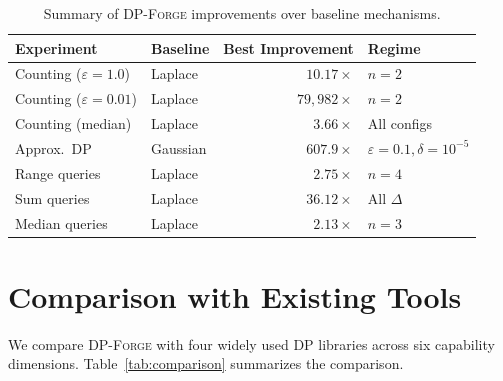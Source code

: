 \documentclass[11pt,a4paper]{article}
\newcommand{\dpforge}{\textsc{DP-Forge}}
\newcommand{\eps}{\varepsilon}
\begin{document}
\begin{table}[t]
\centering
\caption{Summary of \dpforge{} improvements over baseline mechanisms.}
\label{tab:summary}
\small
\begin{tabular}{@{}llrl@{}}
\toprule
Experiment & Baseline & Best Improvement & Regime \\
\midrule
Counting ($\eps=1.0$)  & Laplace  & $10.17\times$ & $n=2$ \\
Counting ($\eps=0.01$) & Laplace  & $79{,}982\times$ & $n=2$ \\
Counting (median)      & Laplace  & $3.66\times$ & All configs \\
Approx.\ DP            & Gaussian & $607.9\times$ & $\eps=0.1, \delta=10^{-5}$ \\
Range queries           & Laplace  & $2.75\times$ & $n=4$ \\
Sum queries             & Laplace  & $36.12\times$ & All $\Delta$ \\
Median queries          & Laplace  & $2.13\times$ & $n=3$ \\
\bottomrule
\end{tabular}
\end{table}


\section{Comparison with Existing Tools}
\label{sec:comparison}

We compare \dpforge{} with four widely used DP libraries across six capability
dimensions.  Table~\ref{tab:comparison} summarizes the comparison.
\end{document}
